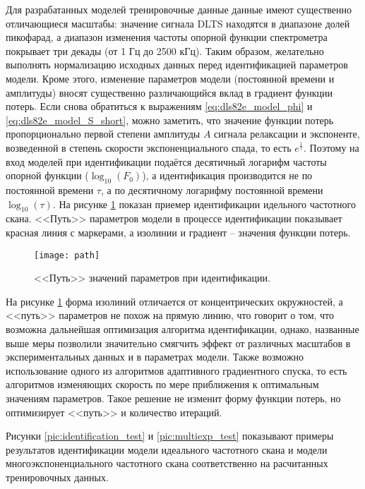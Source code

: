 	Для разрабатанных моделей тренировочные данные данные имеют существенно
	отличающиеся масштабы: значение сигнала DLTS находятся в диапазоне долей
	пикофарад, а диапазон изменения частоты опорной функции спектрометра
	покрывает три декады (от 1 Гц до 2500 кГц). Таким образом, желательно 
	выполнять нормализацию исходных данных перед идентификацией параметров
	модели. Кроме этого, изменение параметров модели (постоянной времени и 
	амплитуды) вносят существенно различающийся вклад в градиент функции потерь.
	Если снова обратиться к выражениям \ref{eq:dls82e_model_phi} и 
	\ref{eq:dls82e_model_S_short}, можно заметить, что значение функции потерь
	пропорционально первой степени амплитуды $A$ сигнала релаксации и экспоненте,
	возведенной в степень скорости экспоненциального спада, то есть
	$e^\frac{1}{\tau}$. Поэтому на вход моделей при идентификации подаётся 
	десятичный логарифм частоты опорной функции ($\log_{10}(F_0)$), а 
	идентификация производится не по постоянной времени $\tau$, а по десятичному
	логарифму постоянной времени $\log_{10}(\tau)$. На рисунке \ref{pic:path}
	показан приемер идентификации идельного частотного скана. <<Путь>> 
	параметров модели в процессе идентификации показывает красная линия с 
	маркерами, а изолинии и градиент -- значения функции потерь.

    \begin{figure}[!htp]
        \centering
        \texttt{[image: path]}
        \caption{<<Путь>> значений параметров при идентификации.}
        \label{pic:path}
    \end{figure}

    На рисунке \ref{pic:path} форма изолиний отличается от концентрических 
    окружностей, а <<путь>> параметров не похож на прямую линию, что говорит
    о том, что возможна дальнейшая оптимизация алгоритма идентификации, однако,
    названные выше меры позволили значительно смягчить эффект от различных 
    масштабов в экспериментальных данных и в параметрах модели. Также возможно
    использование одного из алгоритмов адаптивного градиентного спуска, то есть
    алгоритмов изменяющих скорость по мере приближения к оптимальным значениям
    параметров. Такое решение не изменит форму функции потерь, но оптимизирует
    <<путь>> и количество итераций.

    Рисунки \ref{pic:identification_test} и \ref{pic:multiexp_test} показывают
    примеры результатов идентификации модели идеального частотного скана и 
    модели многоэкспоненциального частотного скана соответственно на 
    расчитанных тренировочных данных.

